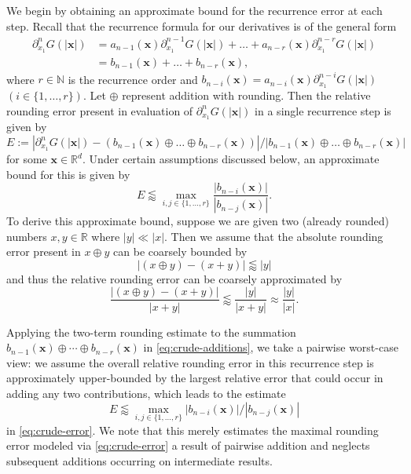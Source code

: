 \documentclass[12pt]{article}
\def\N{{\mathbb N}}
\def\R{{\mathbb R}}
\let\b=\boldsymbol
\theoremstyle{definition}
\theoremstyle{plain}
\theoremstyle{definition}
\begin{document}
We begin by obtaining an approximate bound for the recurrence error at each step. Recall that the recurrence formula for our derivatives is of the general form
\begin{align}
\label{eq:orderrderv}
\partial^n_{x_1} G(|\b{x}|)
&= a_{n-1}(\b{x}) \partial^{n-1}_{x_1} G(|\b{x}|) + \dots + a_{n-r}(\b{x})\partial^{n-r}_{x_1} G(|\b{x}|)\\
&= b_{n-1}(\b{x}) + \dots + b_{n-r}(\b{x}),
\end{align}
where $r \in \N$ is the recurrence order and $b_{n-i}(\b{x}) =  a_{n-i}(\b{x}) \partial^{n-i}_{x_1} G(|\b{x}|)$ $(i \in \{1, \dots, r\})$. Let $\oplus$ represent addition with rounding. Then the relative rounding error present in evaluation of $\partial^n_{x_1} G(|\b{x}|)$ in a single recurrence step is given by
\begin{equation}
\label{eq:crude-additions}
E:=|\partial^n_{x_1} G(|\b{x}|) - (b_{n-1}(\b{x}) \oplus \dots \oplus b_{n-r}(\b{x}))|/|b_{n-1}(\b{x}) \oplus \dots \oplus b_{n-r}(\b{x})|
\end{equation}
for some $\b{x} \in \R^d$. Under certain assumptions discussed below, an approximate bound for this is given by
\begin{equation}
\label{eq:crude-error}
E \lessapprox \max_{i,j \in \{1, \dots, r\}} \frac{|b_{n-i}(\b{x})|}{|b_{n-j}(\b{x})|}.
\end{equation}
To derive this approximate bound, suppose we are given two (already rounded) numbers $x, y\in\mathbb R$ where $|y| \ll |x|$.  Then we assume that the absolute rounding error present in $x \oplus y$ can be coarsely bounded by
\[
|(x\oplus y) - (x+y)|  \lessapprox |y|
\]
and thus the relative rounding error can be coarsely approximated by
\[
\frac{|(x\oplus y) - (x+y)|}{|x+y|}  \lessapprox \frac{|y|}{|x+y|}\approx \frac{|y|}{|x|}.
\]

Applying the two-term rounding estimate to the summation
$b_{n-1}(\b{x}) \oplus \cdots \oplus b_{n-r}(\b{x})$ in \eqref{eq:crude-additions}, we take a pairwise worst-case view: we assume the
overall relative rounding error in this recurrence step is approximately upper-bounded by the largest
relative error that could occur in adding any two contributions, which leads to the estimate
\[E \lessapprox \max_{i,j\in\{1,\dots,r\}} |b_{n-i}(\b{x})|/|b_{n-j}(\b{x})|\]
in \eqref{eq:crude-error}. We note that this merely estimates the maximal rounding error
modeled via \eqref{eq:crude-error} a result of pairwise addition and neglects subsequent
additions occurring on intermediate results.
\end{document}
